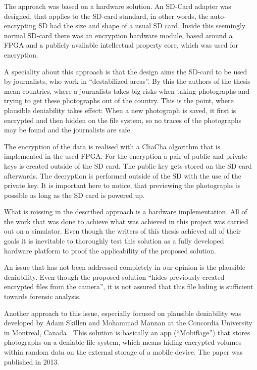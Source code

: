 \documentclass[12pt,a4paper,titlepage,oneside]{scrartcl}
\begin{document}
The approach was based on a hardware solution.
An SD-Card adapter was designed, that applies to the SD-card standard, in other words, the auto-encrypting SD had the size and shape of a usual SD card.
Inside this seemingly normal SD-card there was an encryption hardware module, based around a FPGA and a publicly available intellectual property core, which was used for encryption.

A speciality about this approach is that the design aims the SD-card to be used by journalists, who work in ``destabilized areas''.
By this the authors of the thesis mean countries, where a journalists takes big risks when taking photographs and trying to get these photographs out of the country.
This is the point, where plausible deniability takes effect: When a new photograph is saved, it first is encrypted and then hidden on the file system, so no traces of the photographs may be found and the journalists are safe.

The encryption of the data is realised with a ChaCha algorithm that is implemented in the used FPGA.
For the encryption a pair of public and private keys is created outside of the SD card.
The public key gets stored on the SD card afterwards.
The decryption is performed outside of the SD with the use of the private key.
It is important here to notice, that previewing the photographs is possible as long as the SD card is powered up. 

What is missing in the described approach is a hardware implementation.
All of the work that was done to achieve what was achieved in this project was carried out on a simulator.
Even though the writers of this thesis achieved all of their goals it is inevitable to thoroughly test this solution as a fully developed hardware platform to proof the applicability of the proposed solution.

An issue that has not been addressed completely in our opinion is the plausible deniability.
Even though the proposed solution ``hides previously created encrypted files from the camera'', it is not assured that this file hiding is sufficient towards forensic analysis.

Another approach to this issue, especially focused on plausible deniability was developed by Adam Skillen and Mohammad Mannan at the Concordia University in Montreal, Canada \cite{skillen2013implementing}.
This solution is basically an app (``Mobiflage'') that stores photographs on a deniable file system, which means hiding encrypted volumes within random data on the external storage of a mobile device.
The paper was published in 2013.
\end{document}
